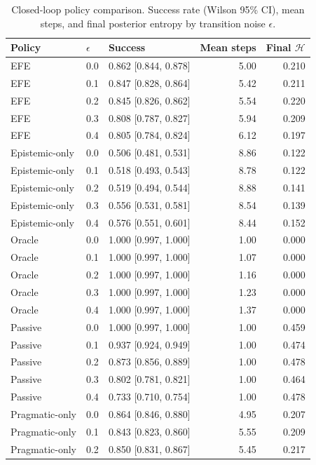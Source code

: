 \begin{table}[t]\centering\footnotesize
\caption{Closed-loop policy comparison. Success rate (Wilson 95\% CI), mean steps, and final posterior entropy by transition noise $\epsilon$.}
\label{tab:closed_loop_policy}
\begin{tabular}{llp{2.6cm}rr}
\toprule
Policy & $\epsilon$ & Success & Mean steps & Final $\mathcal{H}$ \\
\midrule
EFE & 0.0 & 0.862 [0.844, 0.878] & 5.00 & 0.210 \\
EFE & 0.1 & 0.847 [0.828, 0.864] & 5.42 & 0.211 \\
EFE & 0.2 & 0.845 [0.826, 0.862] & 5.54 & 0.220 \\
EFE & 0.3 & 0.808 [0.787, 0.827] & 5.94 & 0.209 \\
EFE & 0.4 & 0.805 [0.784, 0.824] & 6.12 & 0.197 \\
Epistemic-only & 0.0 & 0.506 [0.481, 0.531] & 8.86 & 0.122 \\
Epistemic-only & 0.1 & 0.518 [0.493, 0.543] & 8.78 & 0.122 \\
Epistemic-only & 0.2 & 0.519 [0.494, 0.544] & 8.88 & 0.141 \\
Epistemic-only & 0.3 & 0.556 [0.531, 0.581] & 8.54 & 0.139 \\
Epistemic-only & 0.4 & 0.576 [0.551, 0.601] & 8.44 & 0.152 \\
Oracle & 0.0 & 1.000 [0.997, 1.000] & 1.00 & 0.000 \\
Oracle & 0.1 & 1.000 [0.997, 1.000] & 1.07 & 0.000 \\
Oracle & 0.2 & 1.000 [0.997, 1.000] & 1.16 & 0.000 \\
Oracle & 0.3 & 1.000 [0.997, 1.000] & 1.23 & 0.000 \\
Oracle & 0.4 & 1.000 [0.997, 1.000] & 1.37 & 0.000 \\
Passive & 0.0 & 1.000 [0.997, 1.000] & 1.00 & 0.459 \\
Passive & 0.1 & 0.937 [0.924, 0.949] & 1.00 & 0.474 \\
Passive & 0.2 & 0.873 [0.856, 0.889] & 1.00 & 0.478 \\
Passive & 0.3 & 0.802 [0.781, 0.821] & 1.00 & 0.464 \\
Passive & 0.4 & 0.733 [0.710, 0.754] & 1.00 & 0.478 \\
Pragmatic-only & 0.0 & 0.864 [0.846, 0.880] & 4.95 & 0.207 \\
Pragmatic-only & 0.1 & 0.843 [0.823, 0.860] & 5.55 & 0.209 \\
Pragmatic-only & 0.2 & 0.850 [0.831, 0.867] & 5.45 & 0.217 \\

\end{tabular}
\end{table}
